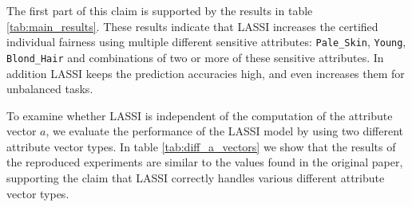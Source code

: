 The first part of this claim is supported by the results in table \ref{tab:main_results}. These results indicate that LASSI increases the certified individual fairness using multiple different sensitive attributes: \texttt{Pale\_Skin}, \texttt{Young}, \texttt{Blond\_Hair} and combinations of two or more of these sensitive attributes. In addition LASSI keeps the prediction accuracies high, and even increases them for unbalanced tasks. \newline


To examine whether LASSI is independent of the computation of the attribute vector \textbf{$a$}, we evaluate the performance of the LASSI model by using two different attribute vector types. In table \ref{tab:diff_a_vectors} we show that the results of the reproduced experiments are similar to the values found in the original paper, supporting the claim that LASSI correctly handles various different attribute vector types.



